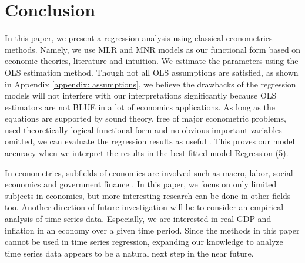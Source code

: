 \section{Conclusion}
\label{sec:conclusion}

In this paper, we present a regression analysis using classical econometrics methods. Namely, we use \acs{MLR} and \acs{MNR} models as our functional form based on economic theories, literature and intuition. We estimate the parameters using the \acs{OLS} estimation method. Though not all \acs{OLS} assumptions are satisfied, as shown in Appendix \ref{appendix: assumptions}, we believe the drawbacks of the regression models will not interfere with our interpretations significantly because \acs{OLS} estimators are not \acs{BLUE} in a lot of economics applications. As long as the equations are supported by sound theory, free of major econometric problems, used theoretically logical functional form and no obvious important variables omitted, we can evaluate the regression results as useful \cite{studenmund_2017}. This proves our model accuracy when we interpret the results in the best-fitted model Regression (5). 

In econometrics, subfields of economics are involved such as macro, labor, social economics and government finance \cite{wooldridge_2020}. In this paper, we focus on only limited subjects in economics, but more interesting research can be done in other fields too. Another direction of future investigation will be to consider an empirical analysis of time series data. Especially, we are interested in real GDP and inflation in an economy over a given time period. Since the methods in this paper cannot be used in time series regression, expanding our knowledge to analyze time series data appears to be a natural next step in the near future.